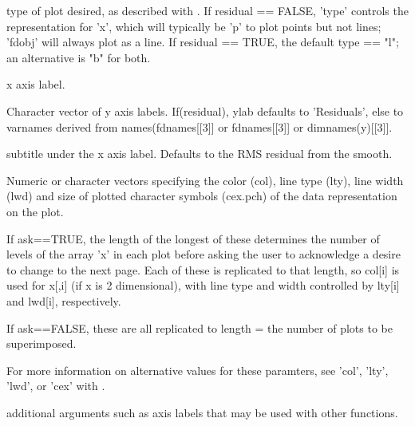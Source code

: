 \begin{Arguments}
\begin{ldescription}
\item[\code{type}] type of plot desired, as described with .  If
residual == FALSE, 'type' controls the representation for 'x', which
will typically be 'p' to plot points but not lines;  'fdobj' will
always plot as a line.  If residual == TRUE, the default type ==
"l";  an alternative is "b" for both.  

\item[\code{xlab}] x axis label. 
\item[\code{ylab}] Character vector of y axis labels.  If(residual), ylab defaults to
'Residuals', else to varnames derived from names(fdnames[[3]] or
fdnames[[3]] or dimnames(y)[[3]]. 

\item[\code{sub}] subtitle under the x axis label.  Defaults to the RMS residual from
the smooth.  

\item[\code{col, lty, lwd, cex.pch}] Numeric or character vectors specifying the color (col), line type
(lty), line width (lwd) and size of plotted character symbols
(cex.pch) of the data representation on the plot. 

If ask==TRUE, the length of the longest of these determines the
number of levels of the array 'x' in each plot before asking the
user to acknowledge a desire to change to the next page.  Each of
these is replicated to that length, so col[i] is used for x[,i] (if
x is 2 dimensional), with line type and width controlled by lty[i]
and lwd[i], respectively.  

If ask==FALSE, these are all replicated to length = the number of
plots to be superimposed.

For more information on alternative values for these paramters, see
'col', 'lty', 'lwd', or 'cex' with .    

\item[\code{... }] additional arguments such as axis labels that may be used with other
 functions. 

\end{ldescription}
\end{Arguments}
